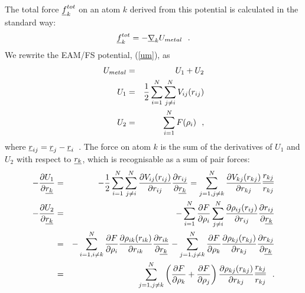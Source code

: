 The total force $\mbox{$\underline{f}$}_{k}^{tot}$ on an atom $k$ derived from this
potential is calculated in the standard way:
\begin{equation}
\mbox{$\underline{f}$}_{k}^{tot} = -\mbox{$\underline{\nabla}$}_{k} U_{metal}~~.
\end{equation}
We rewrite the EAM/FS potential, (\ref{um}), as
\begin{eqnarray}
U_{metal} &=& U_{1} + U_{2} \nonumber \\
U_{1} &=& {1 \over 2} \sum_{i=1}^{N} \sum_{j \ne i}^{N} V_{ij}(r_{ij}) \\
U_{2} &=& \sum_{i=1}^{N} F(\rho_{i})~~, \nonumber
\end{eqnarray}
where $\mbox{$\underline{r}$}_{ij} = \mbox{$\underline{r}$}_{j}-\mbox{$\underline{r}$}_{i}$~.
The force on atom $k$ is the sum of the derivatives of $U_{1}$
and $U_{2}$ with respect to $\mbox{$\underline{r_{k}}$}$, which is recognisable as
a sum of pair forces:
\begin{eqnarray}
-\frac{\partial U_{1}}{\partial \mbox{$\underline{r_{k}}$}} &=& -{1 \over 2} \sum_{i=1}^{N} \sum_{j \ne i}^{N}
\frac{\partial V_{ij}(r_{ij})}{\partial r_{ij}} \frac{\partial r_{ij}}{\partial \mbox{$\underline{r_{k}}$}} =
\sum_{j=1,j \ne k}^{N} \frac{\partial V_{kj}(r_{kj})}{\partial r_{kj}} \frac{\mbox{$\underline{r_{kj}}$}}{r_{kj}} \nonumber \\
-\frac{\partial U_{2}}{\partial \mbox{$\underline{r_{k}}$}} &=& -\sum_{i=1}^{N} \frac{\partial F}{\partial \rho_{i}}
\sum_{j \ne i}^{N} \frac{\partial \rho_{ij}(r_{ij})}{\partial r_{ij}} \frac{\partial r_{ij}}{\partial \mbox{$\underline{r_{k}}$}} \\
&=& -\sum_{i=1,i \ne k}^{N} \frac{\partial F}{\partial \rho_{i}} \frac{\partial \rho_{ik}(r_{ik})}{\partial r_{ik}}
\frac{\partial r_{ik}}{\partial \mbox{$\underline{r_{k}}$}} - \sum_{j=1,j \ne k}^{N} \frac{\partial F}{\partial \rho_{k}}
\frac{\partial \rho_{kj}(r_{kj})}{\partial r_{kj}} \frac{\partial r_{kj}}{\partial \mbox{$\underline{r_{k}}$}} \nonumber \\
&=& \sum_{j=1,j \ne k}^{N} \left( \frac{\partial F}{\partial \rho_{k}} + \frac{\partial F}{\partial \rho_{j}} \right)
\frac{\partial \rho_{kj}(r_{kj})}{\partial r_{kj}} \frac{\mbox{$\underline{r_{kj}}$}}{r_{kj}}~~. \nonumber
\end{eqnarray}
